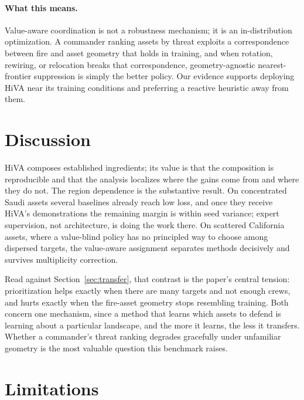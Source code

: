 \documentclass[letterpaper]{article}
\begin{document}
\paragraph{What this means.} Value-aware coordination is not a robustness mechanism; it is an in-distribution optimization. A commander ranking assets by threat exploits a correspondence between fire and asset geometry that holds in training, and when rotation, rewiring, or relocation breaks that correspondence, geometry-agnostic nearest-frontier suppression is simply the better policy. Our evidence supports deploying HiVA near its training conditions and preferring a reactive heuristic away from them.

\section{Discussion}
\label{sec:discussion}

HiVA composes established ingredients; its value is that the composition is reproducible and that the analysis localizes where the gains come from and where they do not. The region dependence is the substantive result. On concentrated Saudi assets several baselines already reach low loss, and once they receive HiVA's demonstrations the remaining margin is within seed variance; expert supervision, not architecture, is doing the work there. On scattered California assets, where a value-blind policy has no principled way to choose among dispersed targets, the value-aware assignment separates methods decisively and survives multiplicity correction.

Read against Section~\ref{sec:transfer}, that contrast is the paper's central tension: prioritization helps exactly when there are many targets and not enough crews, and hurts exactly when the fire-asset geometry stops resembling training. Both concern one mechanism, since a method that learns which assets to defend is learning about a particular landscape, and the more it learns, the less it transfers. Whether a commander's threat ranking degrades gracefully under unfamiliar geometry is the most valuable question this benchmark raises.

\section{Limitations}
\label{sec:limitations}
\end{document}
